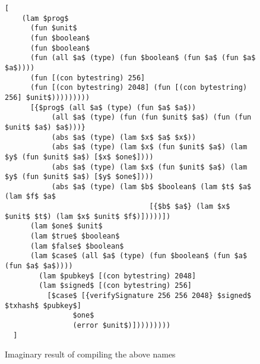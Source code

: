 \documentclass[../main.tex]{subfiles}
\begin{document}
\begin{figure*}
\begin{lstlisting}[basicstyle=\ttfamily,mathescape]
  [
    (lam $prog$
      (fun $unit$ 
      (fun $boolean$
      (fun $boolean$
      (fun (all $a$ (type) (fun $boolean$ (fun $a$ (fun $a$ $a$))))
      (fun [(con bytestring) 256]
      (fun [(con bytestring) 2048] (fun [(con bytestring) 256] $unit$)))))))))
      [{$prog$ (all $a$ (type) (fun $a$ $a$))
           (all $a$ (type) (fun (fun $unit$ $a$) (fun (fun $unit$ $a$) $a$)))}
           (abs $a$ (type) (lam $x$ $a$ $x$))
           (abs $a$ (type) (lam $x$ (fun $unit$ $a$) (lam $y$ (fun $unit$ $a$) [$x$ $one$])))
           (abs $a$ (type) (lam $x$ (fun $unit$ $a$) (lam $y$ (fun $unit$ $a$) [$y$ $one$])))
           (abs $a$ (type) (lam $b$ $boolean$ (lam $t$ $a$ (lam $f$ $a$
                                  [{$b$ $a$} (lam $x$ $unit$ $t$) (lam $x$ $unit$ $f$)]))))])
      (lam $one$ $unit$
      (lam $true$ $boolean$
      (lam $false$ $boolean$
      (lam $case$ (all $a$ (type) (fun $boolean$ (fun $a$ (fun $a$ $a$))))
        (lam $pubkey$ [(con bytestring) 2048]
        (lam $signed$ [(con bytestring) 256]
          [$case$ [{verifySignature 256 256 2048} $signed$ $txhash$ $pubkey$]
                $one$
                (error $unit$)]))))))))
  ]
\end{lstlisting}
\caption{Imaginary result of compiling the above names}
\label{fig:Continuized_Let_Example}
\end{figure*}





\end{document}
